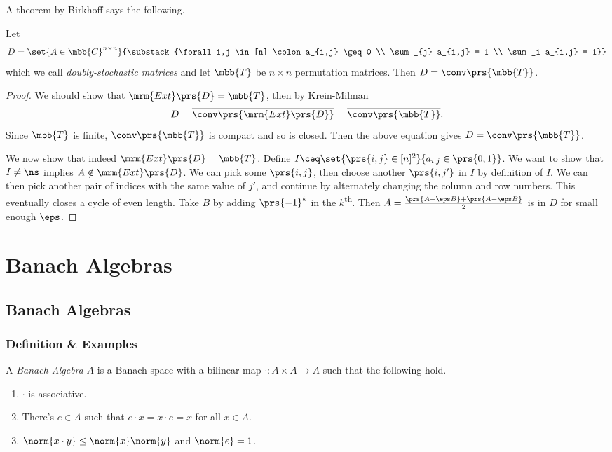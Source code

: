 \documentclass[10pt, twoside]{book}
\begin{document}
\begin{example}
A theorem by Birkhoff says the following.

Let \[D = \set{A \in \mbb{C}^{n \times n}}{\substack{\forall i,j \in [n] \colon a_{i,j} \geq 0 \\ \sum_{j} a_{i,j} = 1 \\ \sum_i a_{i,j} = 1}}\]
which we call \emph{doubly-stochastic matrices}
and let $\mbb{T}$ be $n \times n$ permutation matrices.
Then $D = \conv\prs{\mbb{T}}$.

\begin{proof}
We should show that $\mrm{Ext}\prs{D} = \mbb{T}$, then by Krein-Milman
\[D = \overline{\conv\prs{\mrm{Ext}\prs{D}}} = \overline{\conv\prs{\mbb{T}}} \text{.}\]
Since $\mbb{T}$ is finite, $\conv\prs{\mbb{T}}$ is compact and so is closed. Then the above equation gives $D = \conv\prs{\mbb{T}}$.

We now show that indeed $\mrm{Ext}\prs{D} = \mbb{T}$. Define $I \ceq \set{\prs{i,j} \in [n]^2}{a_{i,j} \in \prs{0,1}}$. We want to show that $I \neq \ns$ implies $A \notin \mrm{Ext}\prs{D}$.
We can pick some $\prs{i,j}$, then choose another $\prs{i,j'}$ in $I$ by definition of $I$. We can then pick another pair of indices with the same value of $j'$, and continue by alternately changing the column and row numbers. This eventually closes a cycle of even length.
Take $B$ by adding $\prs{-1}^k$ in the $k$\textsuperscript{th}. Then $A = \frac{\prs{A + \eps B} + \prs{A - \eps B}}{2}$ is in $D$ for small enough $\eps$.
\end{proof}
\end{example}

\chapter{Banach Algebras}

\section{Banach Algebras}

\subsection{Definition \& Examples}


\begin{definition}
A \emph{Banach Algebra} $A$ is a Banach space with a bilinear map $\cdot \colon A \times A \to A$ such that the following hold.
\begin{enumerate}
\item $\cdot$ is associative.
\item There's $e \in A$ such that $e \cdot x = x \cdot e = x$ for all $x \in A$.
\item $\norm{x \cdot y} \leq \norm{x} \norm{y}$ and $\norm{e} = 1$.
\end{enumerate}
\end{definition}
\end{document}
